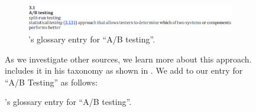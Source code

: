 \ifnotpaper\begin{figure}[h!]\else\begin{figure}[t!]\fi
    \includegraphics[width=\linewidth]{assets/images/a-b testing.png}
    \caption{ \citet[p.~1]{IEEE2022}'s glossary entry for
        ``A/B testing''.}\label{fig:IEEE-A-B-Testing}
\end{figure}

\ifnotpaper
    
    \clearpage
\fi

As we investigate other sources, we learn more about this approach. \ifnotpaper
\else \citeauthor{Firesmith2015} \fi \citet[p.~58]{Firesmith2015} includes it
in his taxonomy as shown in . We add to our
entry for ``A/B Testing'' as follows:


\end{figure}
